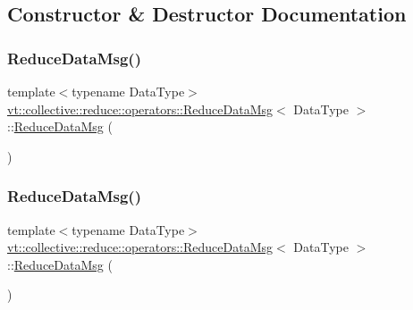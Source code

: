 \subsection{Constructor \& Destructor Documentation}
\mbox{\label{structvt_1_1collective_1_1reduce_1_1operators_1_1_reduce_data_msg_ab5f090157aff94fa6b1c233ccc5e0e04}} 
\subsubsection{\texorpdfstring{Reduce\+Data\+Msg()}{ReduceDataMsg()}\hspace{0.1cm}{\footnotesize\ttfamily [1/5]}}
{\footnotesize\ttfamily template$<$typename Data\+Type$>$ \\
\hyperlink{structvt_1_1collective_1_1reduce_1_1operators_1_1_reduce_data_msg}{vt\+::collective\+::reduce\+::operators\+::\+Reduce\+Data\+Msg}$<$ Data\+Type $>$\+::\hyperlink{structvt_1_1collective_1_1reduce_1_1operators_1_1_reduce_data_msg}{Reduce\+Data\+Msg} (\begin{DoxyParamCaption}{ }\end{DoxyParamCaption})\hspace{0.3cm}{\ttfamily [default]}}

\mbox{\label{structvt_1_1collective_1_1reduce_1_1operators_1_1_reduce_data_msg_a5a693c82cdef46b50e89bf897d579f96}} 
\subsubsection{\texorpdfstring{Reduce\+Data\+Msg()}{ReduceDataMsg()}\hspace{0.1cm}{\footnotesize\ttfamily [2/5]}}
{\footnotesize\ttfamily template$<$typename Data\+Type$>$ \\
\hyperlink{structvt_1_1collective_1_1reduce_1_1operators_1_1_reduce_data_msg}{vt\+::collective\+::reduce\+::operators\+::\+Reduce\+Data\+Msg}$<$ Data\+Type $>$\+::\hyperlink{structvt_1_1collective_1_1reduce_1_1operators_1_1_reduce_data_msg}{Reduce\+Data\+Msg} (\begin{DoxyParamCaption}\item[{\hyperlink{structvt_1_1collective_1_1reduce_1_1operators_1_1_reduce_data_msg}{Reduce\+Data\+Msg}$<$ Data\+Type $>$ const \&}]{ }\end{DoxyParamCaption})\hspace{0.3cm}{\ttfamily [default]}}

